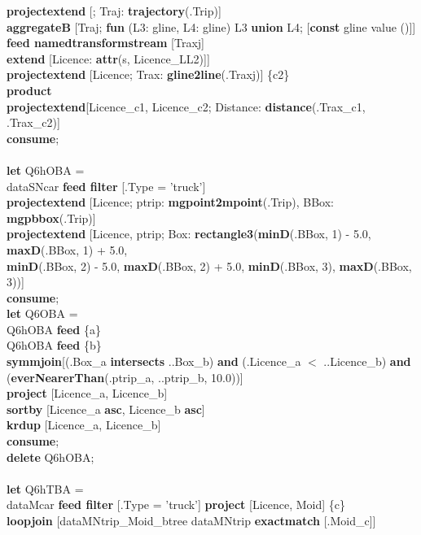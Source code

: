 \documentclass[a4paper]{article}
\newcommand{\op}[1]{\textbf{#1}}
\begin{document}
\begin{scriptsize}
\begin{tabbing}
\>\>\>\op{projectextend} [; Traj: \op{trajectory}(.Trip)]\\
\>\>\>\op{aggregateB} [Traj; \op{fun} (L3: gline, L4: gline) L3 \op{union} L4; [\op{const} gline value ()]]\\
\>\>\>\op{feed namedtransformstream} [Traxj]\\
\>\>\>\op{extend} [Licence: \op{attr}(s, Licence\_LL2)]]\\
\>\>\op{projectextend} [Licence; Trax: \op{gline2line}(.Traxj)] \{c2\}\\
\>\op{product}\\
\>\op{projectextend}[Licence\_c1, Licence\_c2; Distance: \op{distance}(.Trax\_c1, .Trax\_c2)]\\
\op{consume};\\
\\
\op{let} Q6hOBA =\\
\>dataSNcar \op{feed filter} [.Type = 'truck']\\
\>\op{projectextend} [Licence; ptrip: \op{mgpoint2mpoint}(.Trip), BBox: \op{mgpbbox}(.Trip)]\\
\>\op{projectextend} [Licence, ptrip; Box: \op{rectangle3}(\op{minD}(.BBox, 1) - 5.0, \op{maxD}(.BBox, 1) + 5.0,\\
\>\>\>\>\op{minD}(.BBox, 2) - 5.0, \op{maxD}(.BBox, 2) + 5.0, \op{minD}(.BBox, 3), \op{maxD}(.BBox, 3))]\\
\op{consume};\\
\op{let} Q6OBA =\\
\>Q6hOBA \op{feed} \{a\}\\
\>Q6hOBA \op{feed} \{b\}\\
\>\op{symmjoin}[(.Box\_a \op{intersects} ..Box\_b) \op{and} (.Licence\_a $<$ ..Licence\_b) \op{and}\\
\>\>\>\>(\op{everNearerThan}(.ptrip\_a, ..ptrip\_b, 10.0))]\\
\>\op{project} [Licence\_a, Licence\_b]\\
\>\op{sortby} [Licence\_a \op{asc}, Licence\_b \op{asc}]\\
\>\op{krdup} [Licence\_a, Licence\_b]\\
\op{consume};\\
\op{delete} Q6hOBA;\\
\\
\op{let} Q6hTBA =\\
\>dataMcar \op{feed filter} [.Type = 'truck'] \op{project} [Licence, Moid] \{c\}\\
\>\op{loopjoin} [dataMNtrip\_Moid\_btree dataMNtrip \op{exactmatch} [.Moid\_c]]\\

\end{tabbing}
\end{scriptsize}
\end{document}
